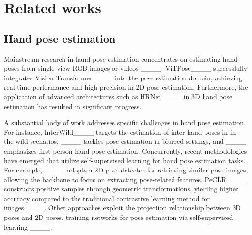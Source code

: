 \section{Related works}
\label{sec:related}

\subsection{Hand pose estimation}

Mainstream research in hand pose estimation concentrates on estimating hand poses from single-view RGB images or videos ____. ViTPose____ successfully integrates Vision Transformer____ into the pose estimation domain, achieving real-time performance and high precision in 2D pose estimation. Furthermore, the application of advanced architectures such as HRNet____ in 3D hand pose estimation has resulted in significant progress.

A substantial body of work addresses specific challenges in hand pose estimation. For instance, InterWild____ targets the estimation of inter-hand poses in in-the-wild scenarios, ____ tackles pose estimation in blurred settings, and ____ emphasizes first-person hand pose estimation. Concurrently, recent methodologies have emerged that utilize self-supervised learning for hand pose estimation tasks. For example, ____ adopts a 2D pose detector for retrieving similar pose images, allowing the backbone to focus on extracting pose-related features. PeCLR____ constructs positive samples through geometric transformations, yielding higher accuracy compared to the traditional contrastive learning method for images____. Other approaches exploit the projection relationship between 3D poses and 2D poses, training networks for pose estimation via self-supervised learning ____.

